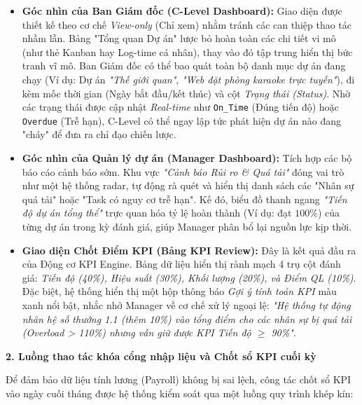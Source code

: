 \documentclass[a4paper,13.5pt]{extreport}
\begin{document}
\begin{itemize}
    \item \textbf{Góc nhìn của Ban Giám đốc (C-Level Dashboard):} Giao diện được thiết kế theo cơ chế \textit{View-only} (Chỉ xem) nhằm tránh các can thiệp thao tác nhầm lẫn. Bảng "Tổng quan Dự án" lược bỏ hoàn toàn các chi tiết vi mô (như thẻ Kanban hay Log-time cá nhân), thay vào đó tập trung hiển thị bức tranh vĩ mô. Ban Giám đốc có thể bao quát toàn bộ danh mục dự án đang chạy (Ví dụ: Dự án \textit{"Thế giới quan"}, \textit{"Web đặt phòng karaoke trực tuyến"}), đi kèm mốc thời gian (Ngày bắt đầu/kết thúc) và cột \textit{Trạng thái (Status)}. Nhờ các trạng thái được cập nhật \textit{Real-time} như \texttt{On\_Time} (Đúng tiến độ) hoặc \texttt{Overdue} (Trễ hạn), C-Level có thể ngay lập tức phát hiện dự án nào đang "cháy" để đưa ra chỉ đạo chiến lược.
    
    \item \textbf{Góc nhìn của Quản lý dự án (Manager Dashboard):} Tích hợp các bộ báo cáo cảnh báo sớm. Khu vực \textit{"Cảnh báo Rủi ro \& Quá tải"} đóng vai trò như một hệ thống radar, tự động rà quét và hiển thị danh sách các "Nhân sự quá tải" hoặc "Task có nguy cơ trễ hạn". Kế đó, biểu đồ thanh ngang \textit{"Tiến độ dự án tổng thể"} trực quan hóa tỷ lệ hoàn thành (Ví dụ: đạt $100\%$) của từng dự án trong kỳ đánh giá, giúp Manager phân bổ lại nguồn lực kịp thời.
    
    \item \textbf{Giao diện Chốt Điểm KPI (Bảng KPI Review):} Đây là kết quả đầu ra của Động cơ KPI Engine. Bảng dữ liệu hiển thị rành mạch 4 trụ cột đánh giá: \textit{Tiến độ (40\%), Hiệu suất (30\%), Khối lượng (20\%), và Điểm QL (10\%)}. Đặc biệt, hệ thống hiển thị một hộp thông báo \textit{Gợi ý tính toán KPI} màu xanh nổi bật, nhắc nhở Manager về cơ chế xử lý ngoại lệ: \textit{"Hệ thống tự động nhân hệ số thưởng 1.1 (thêm 10\%) vào tổng điểm cho các nhân sự bị quá tải (Overload > 110\%) nhưng vẫn giữ được KPI Tiến độ $\ge$ 90\%"}.
\end{itemize}

\textbf{2. Luồng thao tác khóa cổng nhập liệu và Chốt sổ KPI cuối kỳ}

Để đảm bảo dữ liệu tính lương (Payroll) không bị sai lệch, công tác chốt sổ KPI vào ngày cuối tháng được hệ thống kiểm soát qua một luồng quy trình khép kín:
\end{document}
